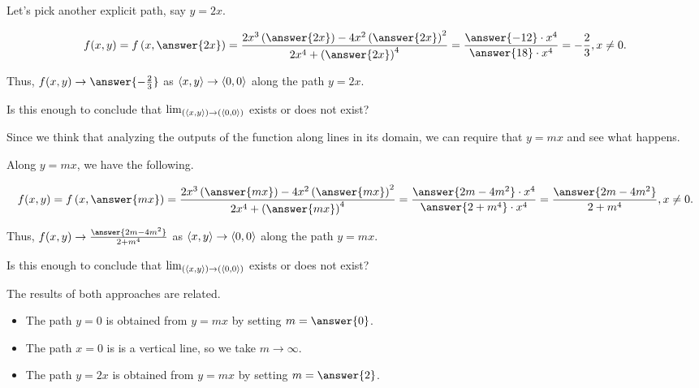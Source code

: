 \documentclass{ximera}
\begin{document}
\begin{exercise}
\begin{exercise}
\begin{exercise}
Let's pick another explicit path, say $y=2x$.  

\[
f(x,y) = f\left(x,\answer{2x}\right) =\frac{2x^3\left(\answer{2x}\right)-4x^2\left(\answer{2x}\right)^2}{2x^4+\left(\answer{2x}\right)^4} = \frac{\answer{-12}\cdot x^4}{\answer{18}\cdot x^4} = -\frac{2}{3}, x \neq 0.
\]

Thus, $f(x,y) \to \answer{-\frac{2}{3}}$ as $\left\langle x,y\right\rangle \to \left\langle 0,0\right\rangle$ along the path $y=2x$.

Is this enough to conclude that $\lim_{\left(\left\langle x,y\right\rangle\right) \to \left(\left\langle 0,0\right\rangle\right)}$ exists or does not exist?

\begin{multipleChoice}
\end{multipleChoice}

\end{exercise}
\end{exercise}
\begin{exercise}
Since we think that analyzing the outputs of the function along lines in its domain, we can require that $y=mx$ and see what happens.

Along $y=mx$, we have the following.  

\[
f(x,y) = f\left(x,\answer{mx}\right) =\frac{2x^3\left(\answer{mx}\right)-4x^2\left(\answer{mx}\right)^2}{2x^4+\left(\answer{mx}\right)^4} = \frac{\answer{2m-4m^2}\cdot x^4}{\answer{2+m^4}\cdot x^4} = \frac{\answer{2m-4m^2}}{2+m^4}, x \neq 0.
\]

Thus, $f(x,y) \to \frac{\answer{2m-4m^2}}{2+m^4}$ as $\left\langle x,y\right\rangle \to \left\langle 0,0\right\rangle$ along the path $y=mx$.

Is this enough to conclude that $\lim_{\left(\left\langle x,y\right\rangle\right) \to \left(\left\langle 0,0\right\rangle\right)}$ exists or does not exist?

\begin{multipleChoice}
\end{multipleChoice}

\begin{exercise}
The results of both approaches are related.

\begin{itemize}
\item The path $y=0$ is obtained from $y=mx$ by setting $m = \answer{0}$.  
\item The path $x=0$ is is a vertical line, so we take $m \to \infty$.
\item The path $y=2x$ is obtained from $y=mx$ by setting $m = \answer{2}$.


\end{itemize}
\end{exercise}
\end{exercise}
\end{exercise}
\end{document}
